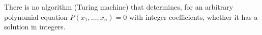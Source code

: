 There is no algorithm (Turing machine) that determines, for an arbitrary polynomial equation $P(x_1, \ldots, x_n) = 0$ with integer coefficients, whether it has a solution in integers.
